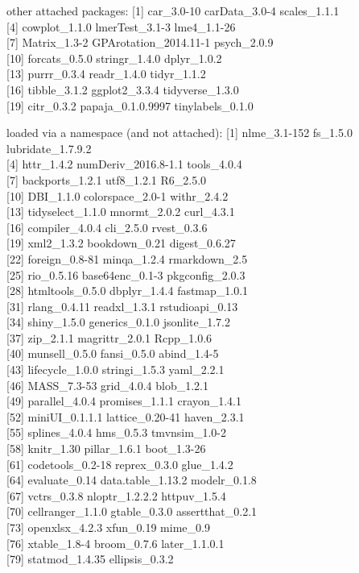 \documentclass[
  english,
  man, noextraspace]{apa7}
\begin{document}
\begin{appendix}
other attached packages: {[}1{]} car\_3.0-10 carData\_3.0-4
scales\_1.1.1\\
{[}4{]} cowplot\_1.1.0 lmerTest\_3.1-3 lme4\_1.1-26\\
{[}7{]} Matrix\_1.3-2 GPArotation\_2014.11-1 psych\_2.0.9\\
{[}10{]} forcats\_0.5.0 stringr\_1.4.0 dplyr\_1.0.2\\
{[}13{]} purrr\_0.3.4 readr\_1.4.0 tidyr\_1.1.2\\
{[}16{]} tibble\_3.1.2 ggplot2\_3.3.4 tidyverse\_1.3.0\\
{[}19{]} citr\_0.3.2 papaja\_0.1.0.9997 tinylabels\_0.1.0

loaded via a namespace (and not attached): {[}1{]} nlme\_3.1-152
fs\_1.5.0 lubridate\_1.7.9.2\\
{[}4{]} httr\_1.4.2 numDeriv\_2016.8-1.1 tools\_4.0.4\\
{[}7{]} backports\_1.2.1 utf8\_1.2.1 R6\_2.5.0\\
{[}10{]} DBI\_1.1.0 colorspace\_2.0-1 withr\_2.4.2\\
{[}13{]} tidyselect\_1.1.0 mnormt\_2.0.2 curl\_4.3.1\\
{[}16{]} compiler\_4.0.4 cli\_2.5.0 rvest\_0.3.6\\
{[}19{]} xml2\_1.3.2 bookdown\_0.21 digest\_0.6.27\\
{[}22{]} foreign\_0.8-81 minqa\_1.2.4 rmarkdown\_2.5\\
{[}25{]} rio\_0.5.16 base64enc\_0.1-3 pkgconfig\_2.0.3\\
{[}28{]} htmltools\_0.5.0 dbplyr\_1.4.4 fastmap\_1.0.1\\
{[}31{]} rlang\_0.4.11 readxl\_1.3.1 rstudioapi\_0.13\\
{[}34{]} shiny\_1.5.0 generics\_0.1.0 jsonlite\_1.7.2\\
{[}37{]} zip\_2.1.1 magrittr\_2.0.1 Rcpp\_1.0.6\\
{[}40{]} munsell\_0.5.0 fansi\_0.5.0 abind\_1.4-5\\
{[}43{]} lifecycle\_1.0.0 stringi\_1.5.3 yaml\_2.2.1\\
{[}46{]} MASS\_7.3-53 grid\_4.0.4 blob\_1.2.1\\
{[}49{]} parallel\_4.0.4 promises\_1.1.1 crayon\_1.4.1\\
{[}52{]} miniUI\_0.1.1.1 lattice\_0.20-41 haven\_2.3.1\\
{[}55{]} splines\_4.0.4 hms\_0.5.3 tmvnsim\_1.0-2\\
{[}58{]} knitr\_1.30 pillar\_1.6.1 boot\_1.3-26\\
{[}61{]} codetools\_0.2-18 reprex\_0.3.0 glue\_1.4.2\\
{[}64{]} evaluate\_0.14 data.table\_1.13.2 modelr\_0.1.8\\
{[}67{]} vctrs\_0.3.8 nloptr\_1.2.2.2 httpuv\_1.5.4\\
{[}70{]} cellranger\_1.1.0 gtable\_0.3.0 assertthat\_0.2.1\\
{[}73{]} openxlsx\_4.2.3 xfun\_0.19 mime\_0.9\\
{[}76{]} xtable\_1.8-4 broom\_0.7.6 later\_1.1.0.1\\
{[}79{]} statmod\_1.4.35 ellipsis\_0.3.2


\end{appendix}
\end{document}
